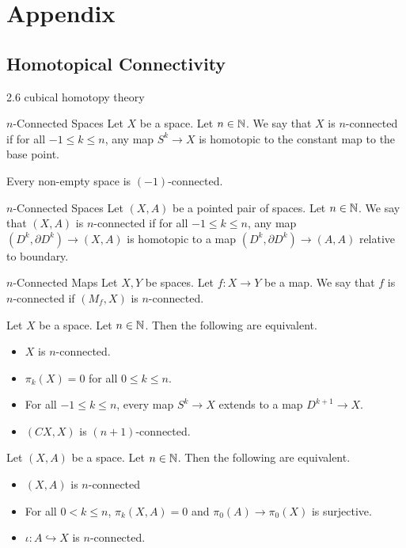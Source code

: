 \documentclass[a4paper]{article}
\begin{document}
\pagebreak
\section{Appendix}
\subsection{Homotopical Connectivity}
2.6 cubical homotopy theory
\begin{defn}{$n$-Connected Spaces}{} Let $X$ be a space. Let $n\in\mathbb{N}$. We say that $X$ is $n$-connected if for all $-1\leq k\leq n$, any map $S^k\to X$ is homotopic to the constant map to the base point. 
\end{defn}

Every non-empty space is $(-1)$-connected. 

\begin{defn}{$n$-Connected Spaces}{} Let $(X,A)$ be a pointed pair of spaces. Let $n\in\mathbb{N}$. We say that $(X,A)$ is $n$-connected if for all $-1\leq k\leq n$, any map $(D^k,\partial D^k)\to(X,A)$ is homotopic to a map $(D^k,\partial D^k)\to (A,A)$ relative to boundary. 
\end{defn}

\begin{defn}{$n$-Connected Maps}{} Let $X,Y$ be spaces. Let $f:X\to Y$ be a map. We say that $f$ is $n$-connected if $(M_f,X)$ is $n$-connected. 
\end{defn}

\begin{prp}{}{} Let $X$ be a space. Let $n\in\mathbb{N}$. Then the following are equivalent. 
\begin{itemize}
\item $X$ is $n$-connected. 
\item $\pi_k(X)=0$ for all $0\leq k\leq n$. 
\item For all $-1\leq k\leq n$, every map $S^k\to X$ extends to a map $D^{k+1}\to X$. 
\item $(CX,X)$ is $(n+1)$-connected. 
\end{itemize}
\end{prp}

\begin{prp}{}{} Let $(X,A)$ be a space. Let $n\in\mathbb{N}$. Then the following are equivalent. 
\begin{itemize}
\item $(X,A)$ is $n$-connected
\item For all $0<k\leq n$, $\pi_k(X,A)=0$ and $\pi_0(A)\to\pi_0(X)$ is surjective. 
\item $\iota:A\hookrightarrow X$ is $n$-connected. 
\end{itemize}
\end{prp}
\end{document}
